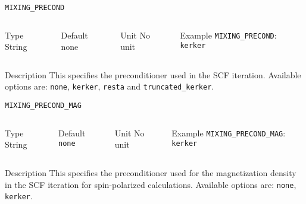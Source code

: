 \documentclass[xcolor=dvipsnames,t]{beamer}
\begin{document}
\begin{frame}[allowframebreaks]{\texttt{MIXING\_PRECOND}} \label{MIXING_PRECOND}
\vspace*{-12pt}
\begin{columns}
\begin{block}{Type}
String
\end{block}

\begin{block}{Default}
none
\end{block}

\begin{block}{Unit}
No unit
\end{block}

\begin{block}{Example}
\texttt{MIXING\_PRECOND}: \texttt{kerker}
\end{block}
\end{columns}

\begin{block}{Description}
This specifies the preconditioner used in the SCF iteration. Available options are: \texttt{none}, \texttt{kerker}, \texttt{resta} and \texttt{truncated\_kerker}.
\end{block}

\end{frame}


\begin{frame}[allowframebreaks]{\texttt{MIXING\_PRECOND\_MAG}} \label{MIXING_PRECOND_MAG}
\vspace*{-12pt}
\begin{columns}
\begin{block}{Type}
String
\end{block}

\begin{block}{Default}
\texttt{none}
\end{block}

\begin{block}{Unit}
No unit
\end{block}

\begin{block}{Example}
\texttt{MIXING\_PRECOND\_MAG}: \texttt{kerker}
\end{block}
\end{columns}

\begin{block}{Description}
This specifies the preconditioner used for the magnetization density in the SCF iteration for spin-polarized calculations. Available options are: \texttt{none}, \texttt{kerker}.
\end{block}

\end{frame}
\end{document}
